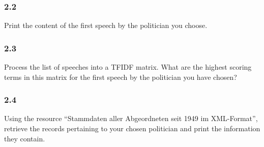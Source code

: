 \documentclass[
]{article}
\begin{document}
\hypertarget{section-4}{%
\subsubsection{2.2}\label{section-4}}

Print the content of the first speech by the politician you choose.

\hypertarget{section-5}{%
\subsubsection{2.3}\label{section-5}}

Process the list of speeches into a TFIDF matrix. What are the highest
scoring terms in this matrix for the first speech by the politician you
have chosen?

\hypertarget{section-6}{%
\subsubsection{2.4}\label{section-6}}

Using the resource ``Stammdaten aller Abgeordneten seit 1949 im
XML-Format'', retrieve the records pertaining to your chosen politician
and print the information they contain.

  
\end{document}
